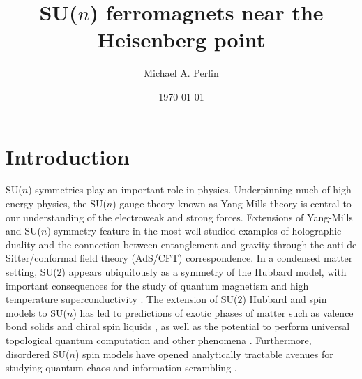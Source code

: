 \documentclass[nofootinbib,notitlepage,11pt]{revtex4-2}
\newcommand{\1}{\mathds{1}}
\begin{document}
\title{SU($n$) ferromagnets near the Heisenberg point}
\author{Michael A. Perlin}
\date{\today}

\maketitle

\tableofcontents

\section{Introduction}

SU($n$) symmetries play an important role in physics.
Underpinning much of high energy physics, the SU($n$) gauge theory known as Yang-Mills theory is central to our understanding of the electroweak and strong forces.
Extensions of Yang-Mills and SU($n$) symmetry feature in the most well-studied examples of holographic duality \cite{maldacena1999largen} and the connection between entanglement and gravity \cite{ryu2006holographic} through the anti-de Sitter/conformal field theory (AdS/CFT) correspondence.
In a condensed matter setting, SU($2$) appears ubiquitously as a symmetry of the Hubbard model, with important consequences for the study of quantum magnetism and high temperature superconductivity \cite{lee2006doping}.
The extension of SU($2$) Hubbard and spin models to SU($n$) has led to predictions of exotic phases of matter such as valence bond solids \cite{read1989valencebond, rokhsar1990quadratic, kaul2012lattice, hermele2011topological} and chiral spin liquids \cite{hermele2009mott, hermele2011topological, chen2016syntheticgaugefield, nataf2016chiral}, as well as the potential to perform universal topological quantum computation \cite{freedman2004class, nayak2008nonabelian} and other phenomena \cite{nataf2014exact, nataf2016exact}.
Furthermore, disordered SU($n$) spin models have opened analytically tractable avenues for studying quantum chaos and information scrambling \cite{sachdev1993gapless, bentsen2019integrable}.
\end{document}
